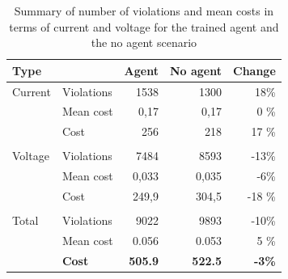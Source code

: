 \documentclass[class=book, crop=false, 11pt]{standalone}
\begin{document}
\begin{table}[h]
\center
\caption{Summary of number of violations and mean costs in terms of current and voltage for the trained agent and the no agent scenario}
\begin{tabular}{l|lrrr}
Type      &               & Agent          & No agent       & Change        \\
\hline
Current   & Violations    & 1538            & 1300            & 18\%            \\
          & Mean cost     & 0,17           & 0,17           & 0 \%         \\
          & Cost          & 256            & 218            & 17 \%         \\
          &               &                &                &               \\
Voltage   & Violations    & 7484           & 8593           & -13\%          \\
          & Mean  cost    & 0,033          & 0,035          & -6\%          \\
          & Cost          & 249,9          & 304,5         & -18 \%        \\
          &               &                &                &               \\
Total     & Violations    & 9022           & 9893           & -10\%          \\
          & Mean cost     & 0.056          & 0.053          & 5 \%         \\
\textbf{} & \textbf{Cost} & \textbf{505.9} & \textbf{522.5} & \textbf{-3\%} \\
\hline
\end{tabular}
\label{table:results:config1_summary}
\end{table}
\end{document}
